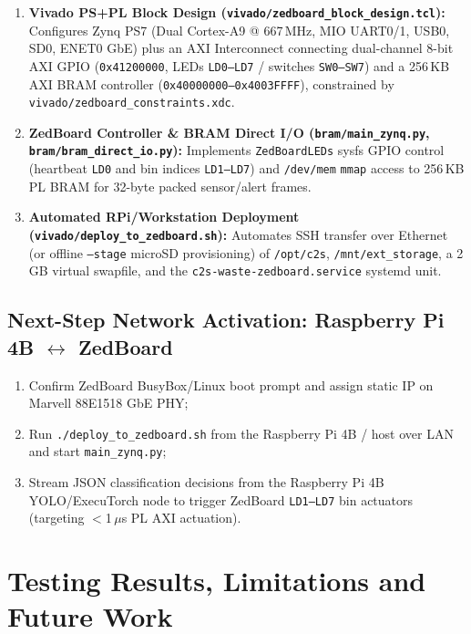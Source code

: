\documentclass[12pt,a4paper]{article}
\begin{document}
\begin{enumerate}[label=\textbf{B\arabic*.}]
  \item \textbf{Vivado PS+PL Block Design (\texttt{vivado/zedboard\_block\_design.tcl}):}
  Configures Zynq PS7 (Dual Cortex-A9 @ 667\,MHz, MIO UART0/1, USB0, SD0, ENET0 GbE) plus an
  AXI Interconnect connecting dual-channel 8-bit AXI GPIO (\texttt{0x41200000}, LEDs
  \texttt{LD0--LD7} / switches \texttt{SW0--SW7}) and a 256\,KB AXI BRAM controller
  (\texttt{0x40000000--0x4003FFFF}), constrained by \texttt{vivado/zedboard\_constraints.xdc}.
  \item \textbf{ZedBoard Controller \& BRAM Direct I/O (\texttt{bram/main\_zynq.py}, \texttt{bram/bram\_direct\_io.py}):}
  Implements \texttt{ZedBoardLEDs} sysfs GPIO control (heartbeat \texttt{LD0} and bin indices
  \texttt{LD1--LD7}) and \texttt{/dev/mem} \texttt{mmap} access to 256\,KB PL BRAM for
  32-byte packed sensor/alert frames.
  \item \textbf{Automated RPi/Workstation Deployment (\texttt{vivado/deploy\_to\_zedboard.sh}):}
  Automates SSH transfer over Ethernet (or offline \texttt{--stage} microSD provisioning) of
  \texttt{/opt/c2s}, \texttt{/mnt/ext\_storage}, a 2\,GB virtual swapfile, and the
  \texttt{c2s-waste-zedboard.service} systemd unit.
\end{enumerate}

\subsection{Next-Step Network Activation: Raspberry Pi 4B $\leftrightarrow$ ZedBoard}

\begin{enumerate}[label=\textbf{E\arabic*.}]
  \item Confirm ZedBoard BusyBox/Linux boot prompt and assign static IP on Marvell 88E1518 GbE PHY;
  \item Run \texttt{./deploy\_to\_zedboard.sh} from the Raspberry Pi 4B / host over LAN and start
  \texttt{main\_zynq.py};
  \item Stream JSON classification decisions from the Raspberry Pi 4B YOLO/ExecuTorch node to trigger
  ZedBoard \texttt{LD1--LD7} bin actuators (targeting $<$1\,$\mu$s PL AXI actuation).
\end{enumerate}

\clearpage

\section{Testing Results, Limitations and Future Work}
\end{document}

